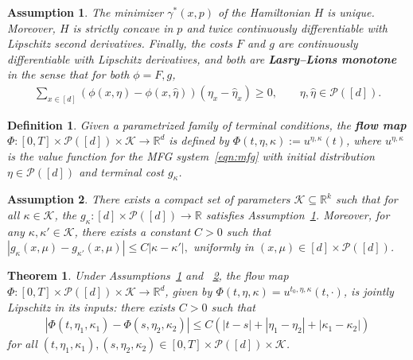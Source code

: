 \documentclass[10pt,a4paper]{amsart}
\newtheorem{assumption}{Assumption}
\newtheorem{definition}{Definition}
\newtheorem{theorem}{Theorem}
\newcommand{\R}{\mathbb{R}}
\newcommand{\calK}{{\mathcal K}}
\newcommand{\calP}{{\mathcal P}}
\begin{document}
\begin{assumption}
\label{asmp:mfg-uniqueness}
    The minimizer $\gamma^*(x, p)$ of the Hamiltonian $H$ is unique. Moreover, $H$ is strictly concave in $p$ and twice continuously differentiable with Lipschitz second derivatives. Finally, the costs $F$ and $g$ are continuously differentiable with Lipschitz derivatives, and both are \textbf{Lasry--Lions monotone} in the sense that for both $\phi = F, g$,
    \begin{align}\label{eqn:LL-monotone}
    \textstyle
        \sum_{x \in [d]} (\phi(x, \eta) - \phi(x, \hat{\eta})) (\eta_x - \hat{\eta}_x) \geq 0, \qquad \eta, \hat{\eta} \in \mathcal{P}([d]).
    \end{align} 
\end{assumption}

\begin{definition}
\label{def:flow-map}
Given a parametrized family of terminal conditions, the \textbf{flow map} $\Phi : [0, T] \times \calP([d]) \times \calK \to \R^d$ is defined by $\Phi(t, \eta, \kappa) := u^{\eta, \kappa}(t)$, where $u^{\eta, \kappa}$ is the value function for the MFG system~\eqref{eqn:mfg} with initial distribution $\eta \in \calP([d])$ and terminal cost $g_\kappa$.
\end{definition}

\begin{assumption}
\label{asmp:param-terminal-cost}
There exists a compact set of parameters $\calK \subseteq \R^k$ such that for all $\kappa \in \calK$, the $g_\kappa : [d] \times \calP([d]) \to \R$ satisfies Assumption~\ref{asmp:mfg-uniqueness}. Moreover, for any $\kappa, \kappa' \in \calK$, there exists a constant $C > 0$ such that
$
    |g_{\kappa}(x, \mu) - g_{\kappa'}(x, \mu)| \leq C|\kappa - \kappa'|,
$
uniformly in $(x, \mu) \in [d] \times \calP([d])$.
\end{assumption}

\begin{theorem}
\label{thm:flow-time-regularity}
Under Assumptions~\ref{asmp:mfg-uniqueness} and ~\ref{asmp:param-terminal-cost}, the flow map $\Phi : [0, T] \times \calP([d]) \times \calK \to \R^d$, given by $\Phi(t, \eta, \kappa) = u^{t_0, \eta, \kappa}(t, \cdot)$, is jointly Lipschitz in its inputs: there exists $C > 0$ such that
\begin{align*}
    |\Phi(t, \eta_1, \kappa_1) - \Phi(s, \eta_2, \kappa_2)| \leq C(|t - s| + |\eta_1 - \eta_2| + |\kappa_1 - \kappa_2|)
\end{align*}
for all $(t, \eta_1, \kappa_1), (s, \eta_2, \kappa_2) \in [0, T] \times \calP([d]) \times \calK$.
\end{theorem}
\end{document}
